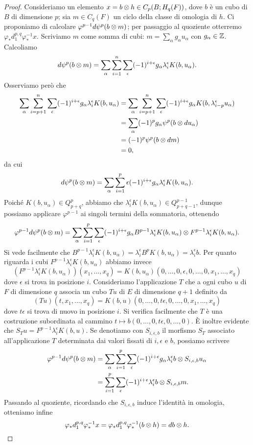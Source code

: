 \begin{proof}
Consideriamo un elemento \(x=b\mathbin{\otimes} h\in C_p(B;H_q(F))\), dove \(b\) è un cubo di \(B\) di dimensione \(p\); sia \(m\in C_q(F)\) un ciclo della classe di omologia di \(h\). Ci proponiamo di calcolare \(\varphi^{p-1}d\psi^p(b\mathbin{\otimes} m)\); per passaggio al quoziente otterremo \(\varphi_*d^{p,q}_1\varphi_*^{-1}x\). Scriviamo \(m\) come somma di cubi: \(m=\sum_{\alpha}g_\alpha u_\alpha\) con \(g_\alpha\in\mathbb{Z}\). Calcoliamo
\[
d\psi^p(b\mathbin{\otimes} m)=\sum_\alpha\sum_{i=1}^n\sum_\epsilon(-1)^{i+\epsilon}g_\alpha\lambda^\epsilon_iK(b,u_\alpha).
\]
Osserviamo però che
\begin{align*}
\sum_\alpha\sum_{i=p+1}^n\sum_\epsilon(-1)^{i+\epsilon}g_\alpha\lambda^\epsilon_iK(b,u_\alpha)&=\sum_{\alpha}\sum_{i=p+1}^n\sum_\epsilon(-1)^{i+\epsilon}g_\alpha K(b,\lambda^\epsilon_{i-p}u_\alpha)\\
&=\sum_\alpha(-1)^pg_\alpha\psi^p(b\mathbin{\otimes} du_\alpha)\\
&=(-1)^p\psi^p(b\mathbin{\otimes} dm)\\
&=0,
\end{align*}
da cui
\[
d\psi^p(b\mathbin{\otimes} m)=\sum_\alpha\sum_{i=1}^p\epsilon(-1)^{i+\epsilon}g_\alpha\lambda^\epsilon_iK(b,u_\alpha).
\]
Poiché \(K(b,u_\alpha)\in Q^p_{p+q}\), abbiamo che \(\lambda^\epsilon_iK(b,u_\alpha)\in Q^{p-1}_{p+q-1}\), dunque possiamo applicare \(\varphi^{p-1}\) ai singoli termini della sommatoria, ottenendo
\[
\varphi^{p-1}d\psi^p(b\mathbin{\otimes} m)=\sum_\alpha\sum_{i=1}^p\sum_\epsilon(-1)^{i+\epsilon}g_\alpha B^{p-1}\lambda^\epsilon_iK(b,u_\alpha)\mathbin{\otimes} F^{p-1}\lambda^\epsilon_iK(b,u_\alpha).
\]
Si vede facilmente che \(B^{p-1}\lambda^{\epsilon}_iK(b,u_\alpha)=\lambda^\epsilon_i B^pK(b,u_\alpha)=\lambda^\epsilon_ib\). Per quanto riguarda i cubi \(F^{p-1}\lambda^\epsilon_iK(b,u_\alpha)\) abbiamo invece
\[
(F^{p-1}\lambda^\epsilon_iK(b,u_\alpha))(x_1,\ldots,x_q)=K(b,u_\alpha)(0,\ldots,0,\epsilon,0,\ldots,0,x_1,\ldots,x_q)
\]
dove \(\epsilon\) si trova in posizione \(i\). Consideriamo l'applicazione \(T\) che a ogni cubo \(u\) di \(F\) di dimensione \(q\) associa un cubo \(Tu\) di \(E\) di dimensione \(q+1\) definito da
\[
(Tu)(t,x_1,\ldots,x_q)=K(b,u)(0,\ldots,0,t\epsilon,0,\ldots,0,x_1,\ldots,x_q)
\]
dove \(t\epsilon\) si trova di nuovo in posizione \(i\). Si verifica facilmente che \(T\) è una costruzione subordinata al cammino \(t\mapsto b(0,\ldots,0,t\epsilon,0,\ldots,0)\). È inoltre evidente che \(S_Tu=F^{p-1}\lambda^\epsilon_iK(b,u)\). Se denotiamo con \(S_{i,\epsilon,b}\) il morfismo \(S_T\) associato all'applicazione \(T\) determinata dai valori fissati di \(i,\epsilon\) e \(b\), possiamo scrivere
\begin{align*}
\varphi^{p-1}d\psi^p(b\mathbin{\otimes} m)&=\sum_\alpha\sum_{i=1}^p\sum_\epsilon(-1)^{i+\epsilon}g_\alpha\lambda^\epsilon_ib\mathbin{\otimes} S_{i,\epsilon,b}u_\alpha\\
&=\sum_{i=1}^p\sum_\epsilon(-1)^{i+\epsilon}\lambda^\epsilon_ib\mathbin{\otimes} S_{i,\epsilon,b}m.
\end{align*}
Passando al quoziente, ricordando che \(S_{i,\epsilon, b}\) induce l'identità in omologia, otteniamo infine
\[
\varphi_*d^{p,q}_1\varphi_*^{-1}x=\varphi_*d^{p,q}_1\varphi_*^{-1}(b\mathbin{\otimes} h)=db\mathbin{\otimes} h.\qedhere
\]
\end{proof}
